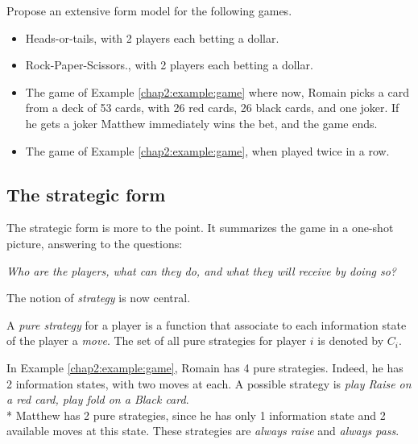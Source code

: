 \begin{exercise}
Propose an extensive form model for the following games. 
\begin{itemize}
\item Heads-or-tails, with 2 players each betting a dollar. 
\item Rock-Paper-Scissors., with 2 players each betting a dollar. 
\item The game of Example \ref{chap2:example:game} where now, Romain picks a card from a deck of 53 cards, with 26 red cards, 26 black cards, and one joker. If he gets a joker Matthew immediately wins the bet, and the game ends.
\item The game of Example \ref{chap2:example:game}, when played twice in a row.
\end{itemize}
\end{exercise}
\subsection{The strategic form}
\label{subsec:StratForm}

The strategic form is more to the point. It summarizes the game in a one-shot picture, answering to the questions:

\begin{center}
\textit{Who are the players, what can they do, and what they will receive by doing so?}  
\end{center}

The notion of \emph{strategy} is now central.
\begin{definition}
A \emph{pure strategy} for a player is a function
 that associate to each information 
 state of the player a \emph{move}. 
 The set of all pure strategies for player $i$ is denoted by $C_i$.
\end{definition}

\begin{example}
In Example \ref{chap2:example:game}, 
Romain has 4 pure strategies. Indeed, he has 2 information states, 
with two moves at each. A possible strategy is 
\emph{play Raise on a red card, play fold on a Black card}.\\*
Matthew has 2 pure strategies, since he has only 1 information state and 2 available moves at this state.
These strategies are \emph{always raise} and \emph{always pass}.
\end{example}

